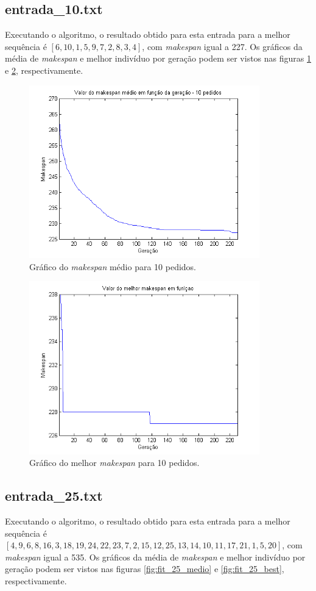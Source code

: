 \documentclass[12pt]{elsarticle}
\begin{document}
	\subsection{entrada\_10.txt}
	Executando o algoritmo, o resultado obtido para esta entrada para a melhor sequência é $[6, 10, 1, 5, 9, 7, 2, 8, 3, 4]$, com \textit{makespan} igual a 227. Os gráficos da média de \textit{makespan} e melhor indivíduo por geração podem ser vistos nas figuras \ref{fig:fit_10_medio} e \ref{fig:fit_10_best}, respectivamente.
	
	\begin{figure}[h]
		\centering
		\includegraphics[width=10cm]{img/fit_10_medio.png}
		\caption{Gráfico do \textit{makespan} médio para 10 pedidos.}
		\label{fig:fit_10_medio}
	\end{figure}
	\begin{figure}[h]
		\centering
		\includegraphics[width=10cm]{img/fit_10_best.png}
		\caption{Gráfico do melhor \textit{makespan} para 10 pedidos.}
		\label{fig:fit_10_best}
	\end{figure}
	\newpage
	\subsection{entrada\_25.txt}
	Executando o algoritmo, o resultado obtido para esta entrada para a melhor sequência é $[4, 9, 6, 8, 16, 3, 18, 19, 24, 22, 23, 7, 2, 15, 12, 25, 13, 14, 10, 11, 17, 21, 1, 5, 20]$, com \textit{makespan} igual a 535. Os gráficos da média de \textit{makespan} e melhor indivíduo por geração podem ser vistos nas figuras \ref{fig:fit_25_medio} e \ref{fig:fit_25_best}, respectivamente.
	
\end{document}
